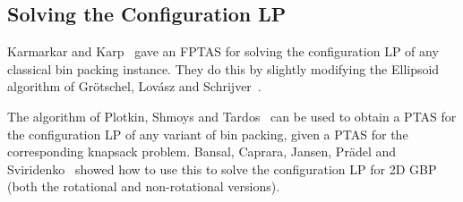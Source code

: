 \subsection{Solving the Configuration LP}

Karmarkar and Karp~\cite{karmarkar-karp} gave an FPTAS for solving the configuration LP
of any classical bin packing instance.
They do this by slightly modifying the Ellipsoid algorithm of
Gr\"otschel, Lov\'asz and Schrijver~\cite{gls-ellipsoid}.

The algorithm of Plotkin, Shmoys and Tardos~\cite{plotkin1995fast} can be used to
obtain a PTAS for the configuration LP of any variant of bin packing,
given a PTAS for the corresponding knapsack problem.
Bansal, Caprara, Jansen, Pr\"adel and Sviridenko~\cite{bansal2009structural}
showed how to use this to solve the configuration LP for 2D GBP
(both the rotational and non-rotational versions).
